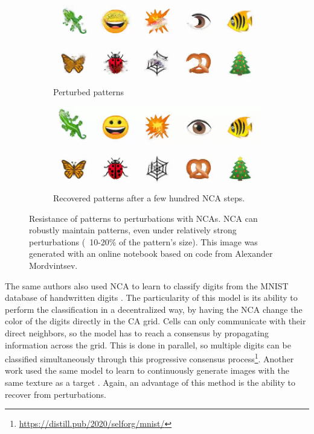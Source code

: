 \begin{figure}[htbp]
  \centering
  \begin{subfigure}[t]{.49\linewidth}
    \centering
    \includegraphics[width=\linewidth]{figures/nca_perturb.png}
    \caption{Perturbed patterns}
    \label{fig:nca_perturb}
  \end{subfigure}
  \begin{subfigure}[t]{.49\linewidth}
    \centering
    \includegraphics[width=\linewidth]{figures/nca_recover.png}
    \caption{Recovered patterns after a few hundred \ac{NCA} steps.}
    \label{fig:nca_recover}
  \end{subfigure}
  \caption{Resistance of patterns to perturbations with \acp{NCA}. \ac{NCA} can
    robustly maintain patterns, even under relatively strong perturbations
    (~10-20\% of the pattern's size). This image was generated with an online
    notebook based on code from Alexander Mordvintsev\footnotemark.}
  \label{fig:nca}
\end{figure}

The same authors also used \ac{NCA} to learn to classify digits from the MNIST
database of handwritten digits
\parencite{randazzoSelfclassifyingMNISTDigits2020}. The particularity of this
model is its ability to perform the classification in a decentralized way, by
having the \ac{NCA} change the color of the digits directly in the \ac{CA} grid.
Cells can only communicate with their direct neighbors, so the model has to
reach a consensus by propagating information across the grid. This is done in
parallel, so multiple digits can be classified simultaneously through this
progressive consensus
process\footnote{\url{https://distill.pub/2020/selforg/mnist/}}.
Another work used the same model to learn to continuously generate images with
the same texture as a target \parencite{niklassonSelfOrganisingTextures2021}.
Again, an advantage of this method is the ability to recover from perturbations.

